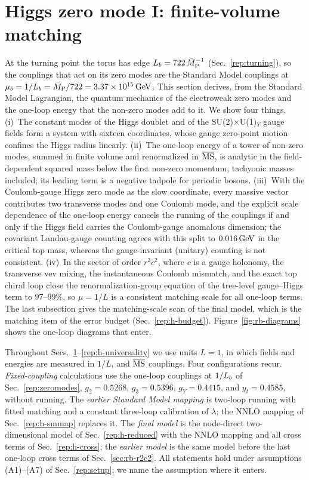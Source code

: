 \section{Higgs zero mode I: finite-volume matching}\label{rep:h-matching}

At the turning point the torus has edge $L_b=722\,\bar M_{\mathrm{P}}^{-1}$ (Sec.~\ref{rep:turning}), so the couplings that act on its zero modes are the Standard Model couplings at $\mu_b=1/L_b=\bar M_{\mathrm{P}}/722=3.37\times10^{15}\,\mathrm{GeV}$. %
This section derives, from the Standard Model Lagrangian, the quantum mechanics of the electroweak zero modes and the one-loop energy that the non-zero modes add to it.
We show four things.
(i)~The constant modes of the Higgs doublet and of the SU(2)$\times$U(1)$_Y$ gauge fields form a system with sixteen coordinates, whose gauge zero-point motion confines the Higgs radius linearly.
(ii)~The one-loop energy of a tower of non-zero modes, summed in finite volume and renormalized in $\overline{\mathrm{MS}}$, is analytic in the field-dependent squared mass below the first non-zero momentum, tachyonic masses included; its leading term is a negative tadpole for periodic bosons.
(iii)~With the Coulomb-gauge Higgs zero mode as the slow coordinate, every massive vector contributes two transverse modes and one Coulomb mode, and the explicit scale dependence of the one-loop energy cancels the running of the couplings if and only if the Higgs field carries the Coulomb-gauge anomalous dimension; the covariant Landau-gauge counting agrees with this split to $0.016\,\mathrm{GeV}$ in the critical top mass, whereas the gauge-invariant (unitary) counting is not consistent. %
(iv)~In the sector of order $r^2c^2$, where $c$ is a gauge holonomy, the transverse vev mixing, the instantaneous Coulomb mismatch, and the exact top chiral loop close the renormalization-group equation of the tree-level gauge--Higgs term to $97$--$99\%$, so $\mu=1/L$ is a consistent matching scale for all one-loop terms. %
The last subsection gives the matching-scale scan of the final model, which is the matching item of the error budget (Sec.~\ref{rep:h-budget}).
Figure~\ref{fig:rb-diagrams} shows the one-loop diagrams that enter.

Throughout Secs.~\ref{rep:h-matching}--\ref{rep:h-universality} we use units $L=1$, in which fields and energies are measured in $1/L$, and $\overline{\mathrm{MS}}$ couplings.
Four configurations recur.
\emph{Fixed-coupling} calculations use the one-loop couplings at $1/L_b$ of Sec.~\ref{rep:zeromodes}, $g_2=0.5268$, $g_3=0.5396$, $g_Y=0.4415$, and $y_t=0.4585$, without running. %
The \emph{earlier Standard Model mapping} is two-loop running with fitted matching and a constant three-loop calibration of $\lambda$; the NNLO mapping of Sec.~\ref{rep:h-smmap} replaces it.
The \emph{final model} is the node-direct two-dimensional model of Sec.~\ref{rep:h-reduced} with the NNLO mapping and all cross terms of Sec.~\ref{rep:h-cross}; the \emph{earlier model} is the same model before the last one-loop cross terms of Sec.~\ref{sec:rb-r2c2}.
All statements hold under assumptions (A1)--(A7) of Sec.~\ref{rep:setup}; we name the assumption where it enters.

